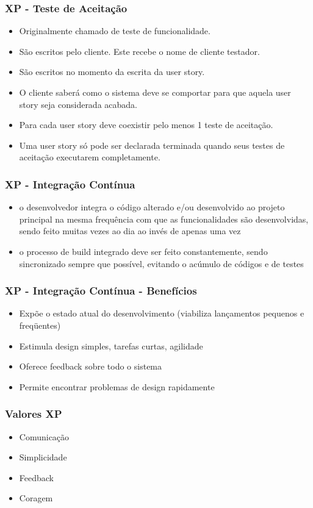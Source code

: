 \begin{frame}
 \frametitle{XP - Teste de Aceitação}
 \begin{itemize}
  \item  Originalmente chamado de teste de funcionalidade.
  \item São escritos pelo cliente. Este recebe o nome de cliente testador.
  \item São escritos no momento da escrita da user story.
  \item O cliente saberá como o sistema deve se comportar para que aquela user story seja considerada acabada.
  \item Para cada user story deve coexistir pelo menos 1 teste de aceitação.
  \item Uma user story só pode ser declarada terminada quando seus testes de aceitação executarem completamente.
 \end{itemize}
\end{frame}

\begin{frame}
 \frametitle{XP - Integração Contínua}
 \begin{itemize}
  \item o desenvolvedor integra o código alterado e/ou desenvolvido ao projeto principal na mesma frequência com que as funcionalidades são desenvolvidas, sendo feito muitas vezes ao dia ao invés de apenas uma vez
  \item o processo de build integrado deve ser feito constantemente, sendo sincronizado sempre que possível, evitando o acúmulo de códigos e de testes
 \end{itemize}
\end{frame}

\begin{frame}
 \frametitle{XP - Integração Contínua - Benefícios}
 \begin{itemize}
  \item Expõe o estado atual do desenvolvimento (viabiliza lançamentos pequenos e freqüentes)
  \item Estimula design simples, tarefas curtas, agilidade
  \item Oferece feedback sobre todo o sistema
  \item Permite encontrar problemas de design rapidamente
 \end{itemize}
\end{frame}


\begin{frame}
 \frametitle{Valores XP}
 \begin{itemize}
  \item Comunicação 
  \item Simplicidade
  \item Feedback
  \item Coragem
 \end{itemize}
\end{frame}


